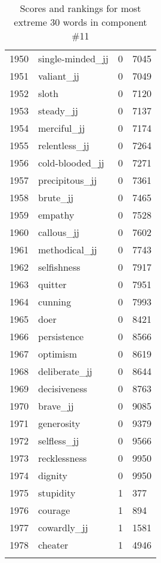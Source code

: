 \begin{longtable}[!htbp]{| rlr@{.}l |}
    1950 & single-minded\_jj & 0 & 7045 \\
    1951 & valiant\_jj & 0 & 7049 \\
    1952 & sloth & 0 & 7120 \\
    1953 & steady\_jj & 0 & 7137 \\
    1954 & merciful\_jj & 0 & 7174 \\
    1955 & relentless\_jj & 0 & 7264 \\
    1956 & cold-blooded\_jj & 0 & 7271 \\
    1957 & precipitous\_jj & 0 & 7361 \\
    1958 & brute\_jj & 0 & 7465 \\
    1959 & empathy & 0 & 7528 \\
    1960 & callous\_jj & 0 & 7602 \\
    1961 & methodical\_jj & 0 & 7743 \\
    1962 & selfishness & 0 & 7917 \\
    1963 & quitter & 0 & 7951 \\
    1964 & cunning & 0 & 7993 \\
    1965 & doer & 0 & 8421 \\
    1966 & persistence & 0 & 8566 \\
    1967 & optimism & 0 & 8619 \\
    1968 & deliberate\_jj & 0 & 8644 \\
    1969 & decisiveness & 0 & 8763 \\
    1970 & brave\_jj & 0 & 9085 \\
    1971 & generosity & 0 & 9379 \\
    1972 & selfless\_jj & 0 & 9566 \\
    1973 & recklessness & 0 & 9950 \\
    1974 & dignity & 0 & 9950 \\
    1975 & stupidity & 1 & 377 \\
    1976 & courage & 1 & 894 \\
    1977 & cowardly\_jj & 1 & 1581 \\
    1978 & cheater & 1 & 4946 \\
    \hline
    \caption{Scores and rankings for most extreme 30 words in component \#11} \\
\end{longtable}
